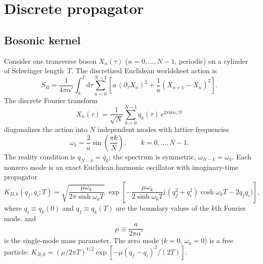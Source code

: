 \documentclass[11pt]{article}
\newcommand{\al}{\alpha'}
\newcommand{\ii}{\mathrm{i}}
\newcommand{\dd}{\mathrm{d}}
\begin{document}
\section{Discrete propagator}
\label{sec:propagator}

\subsection{Bosonic kernel}

Consider one transverse boson $X_n(\tau)$ ($n = 0, \dots, N-1$, periodic) on a cylinder of Schwinger length~$T$. The discretized Euclidean worldsheet action is
\begin{equation}
S_B = \frac{1}{4\pi\al}\int_0^T\!\dd\tau\sum_{n=0}^{N-1}
\left[a\,(\partial_\tau X_n)^2 + \frac{1}{a}(X_{n+1} - X_n)^2\right].
\label{eq:action}
\end{equation}
The discrete Fourier transform
\begin{equation}
X_n(\tau) = \frac{1}{\sqrt{N}}\sum_{k=0}^{N-1}q_k(\tau)\,e^{2\pi\ii k n/N}
\label{eq:dft}
\end{equation}
diagonalizes the action into $N$ independent modes with lattice frequencies
\begin{equation}
\omega_k = \frac{2}{a}\sin\!\left(\frac{\pi k}{N}\right),
\qquad k = 0, \dots, N-1.
\label{eq:freq}
\end{equation}
The reality condition is $q_{N-k} = \bar q_k$; the spectrum is symmetric, $\omega_{N-k} = \omega_k$. Each nonzero mode is an exact Euclidean harmonic oscillator with imaginary-time propagator
\begin{equation}
K_{B,k}(q_f, q_i; T) =
\sqrt{\frac{\mu\omega_k}{2\pi\sinh\omega_k T}}\;
\exp\!\left[-\frac{\mu\omega_k}{2\sinh\omega_k T}
\bigl((q_f^2 + q_i^2)\cosh\omega_k T - 2q_f q_i\bigr)\right],
\label{eq:mode-propagator}
\end{equation}
where $q_i \equiv q_k(0)$ and $q_f \equiv q_k(T)$ are the boundary values of the $k$th Fourier mode, and
\begin{equation}
\mu \equiv \frac{a}{2\pi\al}
\label{eq:mu}
\end{equation}
is the single-mode mass parameter. The zero mode ($k = 0$, $\omega_0 = 0$) is a free particle: $K_{B,0} = (\mu/2\pi T)^{1/2}\exp[-\mu(q_f - q_i)^2/(2T)]$.
\end{document}
